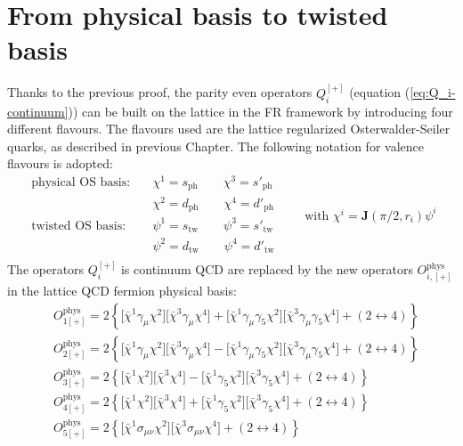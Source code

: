 \documentclass[english, LaM, oneside, noexaminfo]{sapthesis}
\begin{document}
\section{From physical basis to twisted basis}
\noindent
Thanks to the previous proof, the parity even operators $Q_{i}^{[+]}$ (equation (\ref{eq:Q_i-continuum})) can be built on the lattice in the FR framework by introducing four different flavours.
The flavours used are the lattice regularized Osterwalder-Seiler quarks, as described in previous Chapter.
The following notation for valence flavours is adopted:
\begin{equation*}
    \begin{aligned}
        \text{physical OS basis:}
        & \quad \chi^1 = s_\text{ph} \qquad \chi^3 = s'_\text{ph} \\
        & \quad \chi^2 = d_\text{ph} \qquad \chi^4 = d'_\text{ph} \\
        \text{twisted OS basis: }
        & \quad \psi^1 = s_\text{tw} \qquad \psi^3 = s'_\text{tw} \\
        & \quad \psi^2 = d_\text{tw} \qquad \psi^4 = d'_\text{tw} \\
    \end{aligned}
    \qquad
    \text{with } \chi^i = \mathbf{J}(\pi/2,r_i)\psi^i
\end{equation*}
The operators $Q_{i}^{[+]}$ is continuum QCD are replaced by the new operators $O_{i,[+]}^\text{phys}$ in the lattice QCD fermion physical basis:
\begin{equation*}
    \begin{split}
        & O_{1[+]}^\text{phys} = 2 \left\{\big[\bar\chi^1 \gamma_\mu \chi^2 \big] \big[\bar\chi^3 \gamma_\mu \chi^4 \big] + \big[ \bar\chi^1 \gamma_\mu \gamma_5 \chi^2 \big] \big[ \bar\chi^3 \gamma_\mu \gamma_5 \chi^4 \big] + \left(2\leftrightarrow 4\right)\right\} \\
        & O_{2[+]}^\text{phys} = 2 \left\{\big[\bar\chi^1 \gamma_\mu \chi^2 \big] \big[\bar\chi^3 \gamma_\mu \chi^4 \big] - \big[ \bar\chi^1 \gamma_\mu \gamma_5 \chi^2 \big] \big[ \bar\chi^3 \gamma_\mu \gamma_5 \chi^4 \big] + \left(2\leftrightarrow 4\right)\right\} \\
        & O_{3[+]}^\text{phys} = 2 \left\{\big[\bar\chi^1 \chi^2 \big] \big[ \bar\chi^3 \chi^4 \big] - \big[ \bar\chi^1 \gamma_5 \chi^2 \big] \big[ \bar\chi^3 \gamma_5 \chi^4\big] + \left(2\leftrightarrow 4\right)\right\} \\
        & O_{4[+]}^\text{phys} = 2 \left\{\big[\bar\chi^1 \chi^2 \big] \big[ \bar\chi^3 \chi^4 \big] + \big[ \bar\chi^1 \gamma_5 \chi^2 \big] \big[ \bar\chi^3 \gamma_5 \chi^4\big] + \left(2\leftrightarrow 4\right)\right\} \\
        & O_{5[+]}^\text{phys} = 2 \left\{\big[\bar\chi^1 \sigma_{\mu\nu} \chi^2 \big] \big[ \bar\chi^3 \sigma_{\mu\nu} \chi^4 \big] + \left(2\leftrightarrow 4\right)\right\} \\
    \end{split}
\end{equation*}
\end{document}
